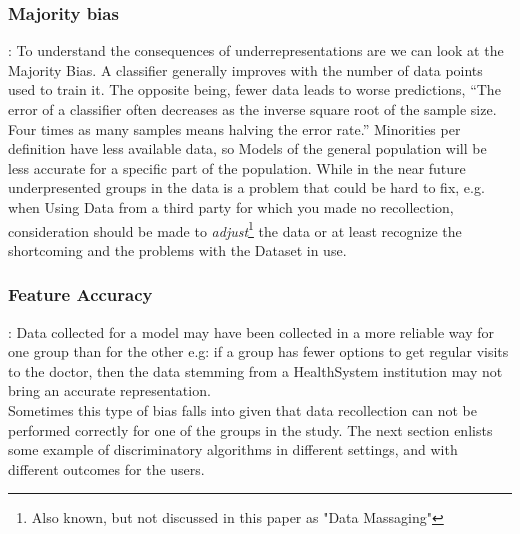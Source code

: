 \subsubsection{Majority bias}:\label{MajorityBias}
To understand the consequences of underrepresentations are we can look at the Majority Bias.
A classifier generally improves with the number of data points used to train it. The opposite being, fewer data leads to worse predictions, “The error of a classifier often decreases as the inverse square root of the sample size. Four times as many samples means halving the error rate.” \cite{Varo18}
Minorities per definition have less available data, so Models of the general population will be less accurate for a specific part of the population. While in the near future underpresented groups in the data is a problem that could be hard to fix, e.g. when Using Data from a third party for which you made no recollection, consideration should be made to \textsl{adjust}\footnote{Also known, but not discussed in this paper as "Data Massaging"} the data or at least recognize the shortcoming and the problems with the Dataset in use.


\subsubsection{Feature Accuracy}:
Data collected for a model may have been collected in a more reliable way for one group than for the other e.g: if a group has fewer options to get regular visits to the doctor, then the data stemming from a HealthSystem institution may not bring an accurate representation. \\
Sometimes this type of bias falls into  given that data recollection can not be performed correctly for one of the groups in the study.
The next section enlists some example of discriminatory algorithms in different settings, and with different outcomes for the users.
